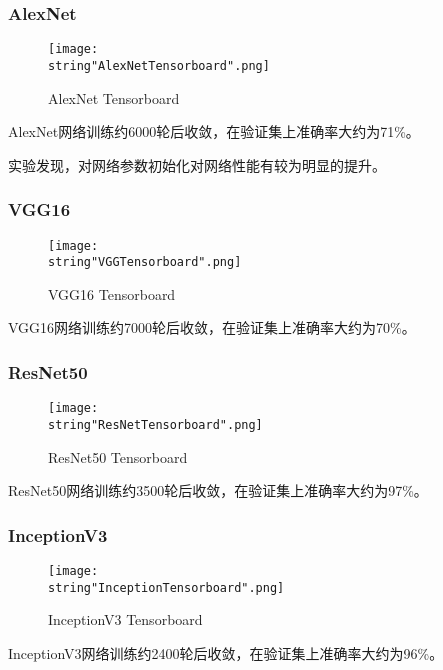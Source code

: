 \documentclass[UTF8]{ctexart}
\begin{document}
\subsubsection{AlexNet}


\begin{figure}[H]
    \begin{center}
        \texttt{[image: \\string"AlexNetTensorboard".png]}
    \caption{AlexNet Tensorboard}
    \label{fig:4}
    \end{center}
    \end{figure}
\par
AlexNet网络训练约6000轮后收敛，在验证集上准确率大约为71\%。\par
实验发现，对网络参数初始化对网络性能有较为明显的提升。\par

\subsubsection{VGG16}

\begin{figure}[H]
    \begin{center}
        \texttt{[image: \\string"VGGTensorboard".png]}
    \caption{VGG16 Tensorboard}
    \label{fig:5}
    \end{center}
    \end{figure}
\par
VGG16网络训练约7000轮后收敛，在验证集上准确率大约为70\%。


\subsubsection{ResNet50}

\begin{figure}[H]
    \begin{center}
        \texttt{[image: \\string"ResNetTensorboard".png]}
    \caption{ResNet50 Tensorboard}
    \label{fig:6}
    \end{center}
    \end{figure}
\par
ResNet50网络训练约3500轮后收敛，在验证集上准确率大约为97\%。

\subsubsection{InceptionV3}

\begin{figure}[H]
    \begin{center}
        \texttt{[image: \\string"InceptionTensorboard".png]}
    \caption{InceptionV3 Tensorboard}
    \label{fig:7}
    \end{center}
    \end{figure}
\par
InceptionV3网络训练约2400轮后收敛，在验证集上准确率大约为96\%。
\end{document}
